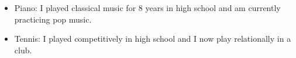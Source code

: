 \begin{itemize}[itemsep=-0.2em]
    \item Piano: I played classical music for 8 years in high school and am currently practicing pop music.
    \item Tennis: I played competitively in high school and  I now play relationally in a club.
\end{itemize}